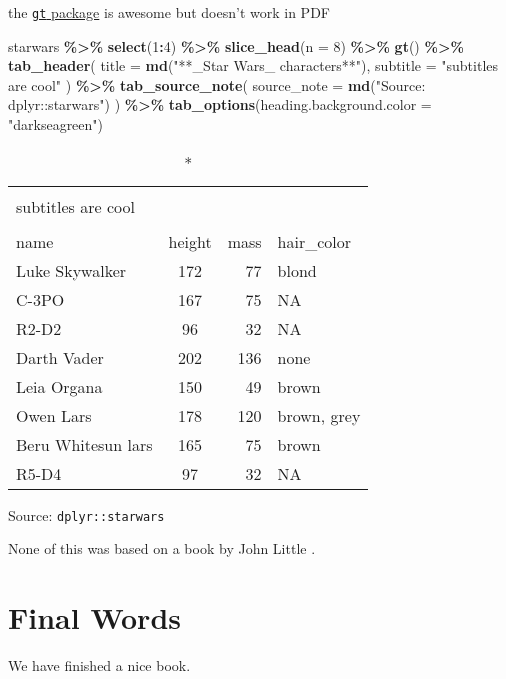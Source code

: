 \documentclass[
]{book}
\newenvironment{Shaded}{\begin{snugshade}}{\end{snugshade}}
\newcommand{\DataTypeTok}[1]{\textcolor[rgb]{0.13,0.29,0.53}{#1}}
\newcommand{\DecValTok}[1]{\textcolor[rgb]{0.00,0.00,0.81}{#1}}
\newcommand{\KeywordTok}[1]{\textcolor[rgb]{0.13,0.29,0.53}{\textbf{#1}}}
\newcommand{\NormalTok}[1]{#1}
\newcommand{\OperatorTok}[1]{\textcolor[rgb]{0.81,0.36,0.00}{\textbf{#1}}}
\newcommand{\StringTok}[1]{\textcolor[rgb]{0.31,0.60,0.02}{#1}}
\begin{document}
the \href{https://gt.rstudio.com/}{\texttt{gt} package} is awesome but doesn't work in PDF

\begin{Shaded}
\begin{Highlighting}[]
\NormalTok{starwars }\OperatorTok{\%\textgreater{}\%}\StringTok{ }
\StringTok{  }\KeywordTok{select}\NormalTok{(}\DecValTok{1}\OperatorTok{:}\DecValTok{4}\NormalTok{) }\OperatorTok{\%\textgreater{}\%}\StringTok{ }
\StringTok{  }\KeywordTok{slice\_head}\NormalTok{(}\DataTypeTok{n =} \DecValTok{8}\NormalTok{) }\OperatorTok{\%\textgreater{}\%}\StringTok{ }
\StringTok{  }\KeywordTok{gt}\NormalTok{() }\OperatorTok{\%\textgreater{}\%}\StringTok{ }
\StringTok{  }\KeywordTok{tab\_header}\NormalTok{(}
    \DataTypeTok{title =} \KeywordTok{md}\NormalTok{(}\StringTok{"**\_Star Wars\_ characters**"}\NormalTok{),}
    \DataTypeTok{subtitle =} \StringTok{"subtitles are cool"}
\NormalTok{    ) }\OperatorTok{\%\textgreater{}\%}\StringTok{ }
\StringTok{  }\KeywordTok{tab\_source\_note}\NormalTok{(}
    \DataTypeTok{source\_note =} \KeywordTok{md}\NormalTok{(}\StringTok{"Source:  \textasciigrave{}dplyr::starwars\textasciigrave{}"}\NormalTok{)}
\NormalTok{    ) }\OperatorTok{\%\textgreater{}\%}\StringTok{ }
\StringTok{  }\KeywordTok{tab\_options}\NormalTok{(}\DataTypeTok{heading.background.color =} \StringTok{"darkseagreen"}\NormalTok{)}
\end{Highlighting}
\end{Shaded}

\captionsetup[table]{labelformat=empty,skip=1pt}
\begin{longtable}{lcrl}
\caption*{
\large \textbf{\emph{Star Wars} characters}\\ 
\small subtitles are cool\\ 
} \\ 
\toprule
name & height & mass & hair\_color \\ 
\midrule
Luke Skywalker & 172 & 77 & blond \\ 
C-3PO & 167 & 75 & NA \\ 
R2-D2 & 96 & 32 & NA \\ 
Darth Vader & 202 & 136 & none \\ 
Leia Organa & 150 & 49 & brown \\ 
Owen Lars & 178 & 120 & brown, grey \\ 
Beru Whitesun lars & 165 & 75 & brown \\ 
R5-D4 & 97 & 32 & NA \\ 
\bottomrule
\end{longtable}
\begin{minipage}{\linewidth}
Source:  \texttt{dplyr::starwars}\\ 
\end{minipage}

None of this was based on a book by John Little \citep{Little2018}.

\hypertarget{final-words}{%
\chapter{Final Words}\label{final-words}}

We have finished a nice book.

  
\end{document}
